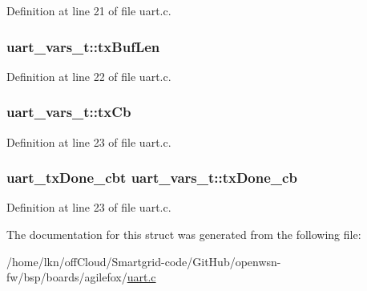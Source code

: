 Definition at line 21 of file uart.\+c.

\subsubsection[{\texorpdfstring{tx\+Buf\+Len}{txBufLen}}]{ uart\+\_\+vars\+\_\+t\+::tx\+Buf\+Len}\hypertarget{structuart__vars__t_a22b20980da9c744b84a2e614a2e7585c}{}\label{structuart__vars__t_a22b20980da9c744b84a2e614a2e7585c}


Definition at line 22 of file uart.\+c.

\subsubsection[{\texorpdfstring{tx\+Cb}{txCb}}]{ uart\+\_\+vars\+\_\+t\+::tx\+Cb}\hypertarget{structuart__vars__t_a1783a73b6fd0c934e97393aafcb077f6}{}\label{structuart__vars__t_a1783a73b6fd0c934e97393aafcb077f6}


Definition at line 23 of file uart.\+c.

\subsubsection[{\texorpdfstring{tx\+Done\+\_\+cb}{txDone_cb}}]{\setlength{\rightskip}{0pt plus 5cm}uart\+\_\+tx\+Done\+\_\+cbt uart\+\_\+vars\+\_\+t\+::tx\+Done\+\_\+cb}\hypertarget{structuart__vars__t_a80cbcfa962a9636c36027b6d16b03618}{}\label{structuart__vars__t_a80cbcfa962a9636c36027b6d16b03618}


Definition at line 23 of file uart.\+c.



The documentation for this struct was generated from the following file\+:\begin{DoxyCompactItemize}
\item 
/home/lkn/off\+Cloud/\+Smartgrid-\/code/\+Git\+Hub/openwsn-\/fw/bsp/boards/agilefox/\hyperlink{agilefox_2uart_8c}{uart.\+c}\end{DoxyCompactItemize}
